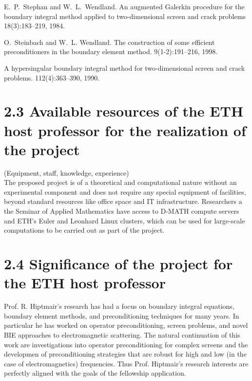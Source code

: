 \documentclass[]{article}
\begin{document}
\begin{small}
\begin{thebibliography}{0}
		E.~P.~Stephan and W.~L.~Wendland.
		\newblock An augmented Galerkin procedure for the boundary integral method applied to two-dimensional screen and crack problems
		 18(3):183--219, 1984.
		
		
		O.~Steinbach and W.~L. Wendland.
		\newblock The construction of some efficient preconditioners in the boundary
		element method.
		 9(1-2):191--216, 1998.
		
		\newblock A hypersingular boundary integral method for two-dimensional screen and crack problems.
		 112(4):363--390, 1990.
		

		
		
	\end{thebibliography}
\end{small}

\section*{2.3 Available resources of the ETH host professor for the realization of the project}
(Equipment, staff, knowledge, experience)\\

The proposed project is of a theoretical and computational nature without an experimental component and does not require any special equipment of facilities, beyond standard resources like office space and IT infrastructure. Researchers a the Seminar of Applied Mathematics have access to D-MATH compute servers and ETH's Euler and Leonhard Linux clusters, which can be used for large-scale computations to be carried out as part of the project.

\section*{2.4 Significance of the project for the ETH host professor} 

Prof. R. Hiptmair's research has had a focus on boundary integral equations, boundary element methods, and preconditioning techniques for many years. In particular he has worked on operator preconditioning, screen problems, and novel BIE approaches to electromagnetic scattering. The natural continuation of this work are investigations into operator preconditioning for complex screens and the developmen of preconditioning strategies that are robust for high and low (in the case of electromagnetics) frequencies. Thus Prof. Hiptmair's research interests are perfectly aligned with the goals of the fellowship application.
\end{document}
